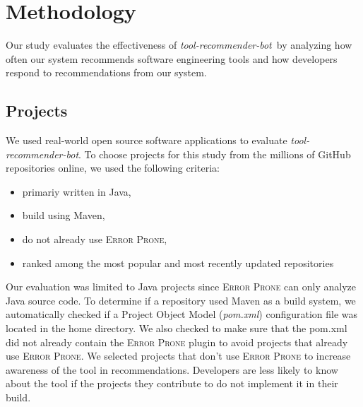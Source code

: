 \documentclass[sigconf,review,anonymous]{acmart}
\newcommand{\tool}{\textsl{tool-recommender-bot}}
\begin{document}
\section{Methodology}

Our study evaluates the effectiveness of \tool~by analyzing how often our system recommends software engineering tools and how developers respond to recommendations from our system.

\subsection{Projects}

We used real-world open source software applications to evaluate \tool. To choose projects for this study from the millions of GitHub repositories online, we used the following criteria:

\begin{itemize}
\item primariy written in Java,
\item build using Maven,
\item do not already use \textsc{Error Prone},
\item ranked among the most popular and most recently updated repositories
\end{itemize}

Our evaluation was limited to Java projects since \textsc{Error Prone} can only analyze Java source code. To determine if a repository used Maven as a build system, we automatically checked if a Project Object Model (\textit{pom.xml}) configuration file was located in the home directory. We also checked to make sure that the pom.xml did not already contain the \textsc{Error Prone} plugin to avoid projects that already use \textsc{Error Prone}. We selected projects that don't use \textsc{Error Prone} to increase awareness of the tool in recommendations. Developers are less likely to know about the tool if the projects they contribute to do not implement it in their build. 
\end{document}
